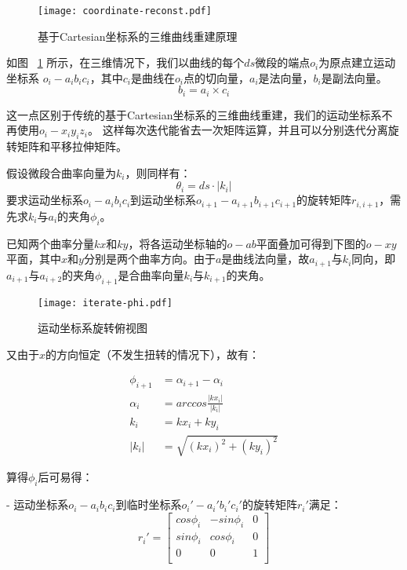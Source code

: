 \begin{figure}
\centering
\texttt{[image: coordinate-reconst.pdf]}
\caption{基于Cartesian坐标系的三维曲线重建原理}
\label{fig:coordinate-reconst} 
\end{figure}


如图 ~\ref{fig:coordinate-reconst} 所示，在三维情况下，我们以曲线的每个$ds$微段的端点$o_i$为原点建立运动坐标系\cite{three-dimensional-curve} $o_i-a_ib_ic_i$，其中$c_i$是曲线在$o_i$点的切向量，$a_i$是法向量，$b_i$是副法向量。
\begin{equation}
b_i = a_i \times c_i
\end{equation}

这一点区别于传统的基于Cartesian坐标系的三维曲线重建，我们的运动坐标系不再使用$o_i-x_iy_iz_i$。
这样每次迭代能省去一次矩阵运算，并且可以分别迭代分离旋转矩阵和平移拉伸矩阵。

假设微段合曲率向量为$k_i$，则同样有：
\begin{equation}
\theta_i = ds\cdot |k_i|
\end{equation}
要求运动坐标系$o_i-a_ib_ic_i$到运动坐标系$o_{i+1}-a_{i+1}b_{i+1}c_{i+1}$的旋转矩阵$r_{i, i+1}$，需先求$k_i$与$a_i$的夹角$\phi_i$。

已知两个曲率分量$kx$和$ky$，将各运动坐标轴的$o-ab$平面叠加可得到下图的$o-xy$平面，其中$x$和$y$分别是两个曲率方向。由于$a$是曲线法向量，故$a_{i+1}$与$k_i$同向，即$a_{i+1}$与$a_{i+2}$的夹角$\phi_{i+1}$是合曲率向量$k_i$与$k_{i+1}$的夹角。

\begin{figure}
\centering
\texttt{[image: iterate-phi.pdf]}
\caption{运动坐标系旋转俯视图}
\label{fig:iterate-phi} 
\end{figure}

又由于$x$的方向恒定（不发生扭转的情况下），故有：

\begin{align}
\phi_{i+1} &= \alpha_{i+1} - \alpha_i \\
\alpha_i &= arccos\frac{|kx_i|}{|k_i|} \\
k_i &= kx_i + ky_i \\
|k_i| &= \sqrt{(kx_i)^2 + (ky_i)^2}
\end{align}

算得$\phi_i$后可易得：

- 运动坐标系$o_i-a_ib_ic_i$到临时坐标系$o_i'-a_i'b_i'c_i'$的旋转矩阵$r_i'$满足：
    \begin{equation}
    r_i' = \left[
            \begin{matrix}
            cos\phi_i & -sin\phi_i & 0\\
            sin\phi_i & cos\phi_i & 0\\
            0 & 0 & 1\\
            \end{matrix}
        \right]
    \end{equation}
    
